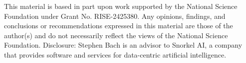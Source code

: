 This material is based in part upon work supported by the National Science Foundation under Grant No. RISE-2425380. Any opinions, findings, and conclusions or recommendations expressed in this material are those of the author(s) and do not necessarily reflect the views of the National Science Foundation. Disclosure: Stephen Bach is an advisor to Snorkel AI, a company that provides software and services for data-centric artificial intelligence.